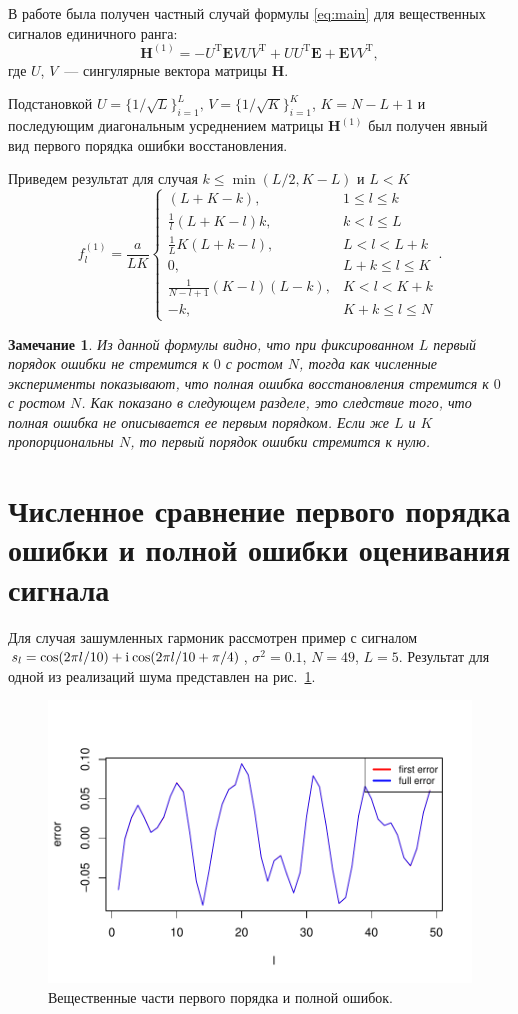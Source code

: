 \documentclass{spisok-article}
\newtheorem{remark}{Замечание}%
\begin{document}
В работе \cite{NekrutkinPerp} была получен частный случай формулы \eqref{eq:main} для вещественных сигналов единичного ранга:
$$\mathbf{H}^{(1)} = -U^{\mathrm{T}} \mathbf{E} V U V^{\mathrm{T}} + U U^{\mathrm{T}} \mathbf{E} + \mathbf{E} V V^{\mathrm{T}},$$
где $U$, $V$~--- сингулярные вектора матрицы $\mathbf{H}$.

Подстановкой $U = \{1/\sqrt{L}\}^{L}_{i = 1},\, V = \{1/\sqrt{K}\}^{K}_{i = 1}$, $K = N - L + 1$ и последующим диагональным усреднением матрицы $\mathbf{H}^{(1)}$ был получен явный вид первого порядка ошибки восстановления.

Приведем результат для случая $k \leq \min(L/2, K - L)$ и $L < K$
$$f^{(1)}_l = \frac{a}{{LK}}
\begin{cases}
	(L + K - k), & \text{$1 \leq l \leq k$}\\
	\frac{1}{l}(L + K - l)k, & \text{$k < l \leq L$}\\
	\frac{1}{L}K(L + k - l), &\text{$L < l < L + k$}\\
	0, &\text{$L + k \leq l \leq K$}\\
	\frac{1}{N - l + 1}(K - l)(L - k), &\text{$K < l < K + k$}\\
	-k, &\text{$K + k \leq l \leq N $}
\end{cases}.$$

\begin{remark}
Из данной формулы видно, что при фиксированном $L$ первый порядок ошибки не стремится к $0$ с ростом $N$, тогда как численные эксперименты показывают, что полная ошибка восстановления стремится к $0$ с ростом $N$. Как показано в следующем разделе, это следствие того, что полная ошибка не описывается ее первым порядком. Если же $L$ и $K$ пропорциональны $N$, то первый порядок ошибки стремится к нулю.
\end{remark}

\section{Численное сравнение первого порядка ошибки и полной ошибки оценивания сигнала}
\label{sec:results}
Для случая зашумленных гармоник рассмотрен пример с сигналом $s_l = \cos(2 \pi l / 10) + \mathrm{i}\mkern1mu\cos(2 \pi l / 10 + \pi/4)$, $\sigma^2 = 0.1$, $N = 49$, $L = 5$. Результат для одной из реализаций шума представлен на рис.~\ref{fig:harm_noise}.

\begin{figure}[H]
	\begin{center}
		\includegraphics[width=0.6\linewidth]{img/first_vs_full_re.pdf}
		\caption{Вещественные части первого порядка и полной ошибок.}
		\label{fig:harm_noise}
	\end{center}
\end{figure}
\end{document}
